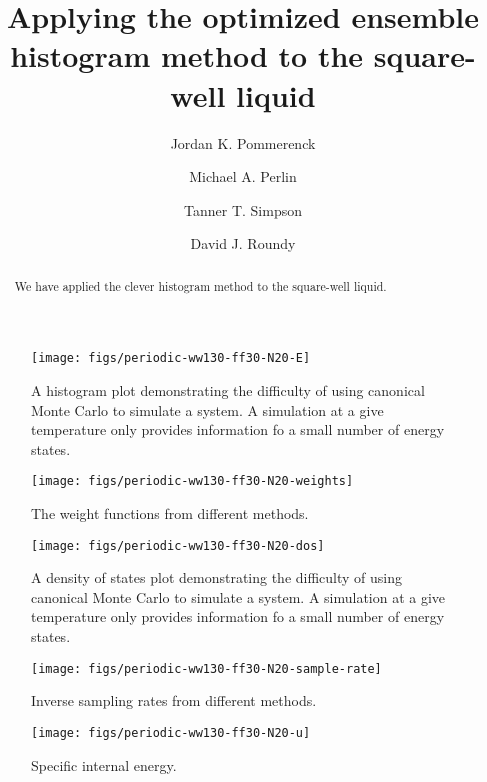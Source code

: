 \documentclass[letterpaper,twocolumn,amsmath,amssymb,pre,aps,10pt]{revtex4-1}
\begin{document}
\title{Applying the optimized ensemble histogram method to the
  square-well liquid}

\author{Jordan K. Pommerenck} \author{Michael A. Perlin} 
\author{Tanner T. Simpson} \author{David J. Roundy}

\begin{abstract}
  We have applied the clever histogram method to the square-well
  liquid.
\end{abstract}

\maketitle

\begin{figure}
  \texttt{[image: figs/periodic-ww130-ff30-N20-E]}
  \caption{A histogram plot demonstrating the difficulty of using
    canonical Monte Carlo to simulate a system.  A simulation at a
    give temperature only provides information fo a small number of
    energy states.\label{fig:histograms}}
\end{figure}

\begin{figure}
  \texttt{[image: figs/periodic-ww130-ff30-N20-weights]}
  \caption{The weight functions from different methods.}
\end{figure}

\begin{figure}
  \texttt{[image: figs/periodic-ww130-ff30-N20-dos]}
  \caption{A density of states plot demonstrating the difficulty of
    using canonical Monte Carlo to simulate a system.  A simulation at
    a give temperature only provides information fo a small number of
    energy states.\label{fig:dos}}
\end{figure}

\begin{figure}
  \texttt{[image: figs/periodic-ww130-ff30-N20-sample-rate]}
  \caption{Inverse sampling rates from different methods.}
\end{figure}


\begin{figure}
  \texttt{[image: figs/periodic-ww130-ff30-N20-u]}
  \caption{Specific internal energy.\label{fig:u}}
\end{figure}
\end{document}
